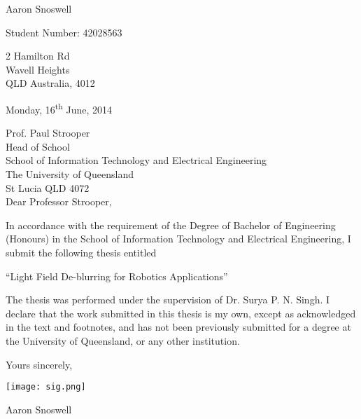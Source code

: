 \thispagestyle{empty}

\begin{flushright}

Aaron Snoswell

Student Number: 42028563

2 Hamilton Rd \\
Wavell Heights \\
QLD Australia, 4012
\end{flushright}


\begin{flushleft}

Monday, 16\textsuperscript{th} June, 2014

\bigskip

Prof. Paul Strooper \\
Head of School \\
School of Information Technology and Electrical Engineering \\
The University of  Queensland \\
St Lucia QLD 4072 \\

\vspace*{\baselineskip}
Dear Professor Strooper,

\vspace*{\baselineskip}
In accordance with the requirement of the Degree of Bachelor of Engineering (Honours) in the School of Information Technology and Electrical Engineering, I submit the following thesis entitled
\begin{center}

\enquote{Light Field De-blurring for Robotics Applications}

\end{center}
The thesis was performed under the supervision of Dr. Surya P. N. Singh. I declare that the work submitted in this thesis is my own, except as acknowledged in the text and footnotes, and has not been previously submitted for a degree at the University of Queensland, or any other institution.

\vspace*{\baselineskip}

Yours sincerely,


\medskip
\texttt{[image: sig.png]}

Aaron Snoswell

\end{flushleft}
